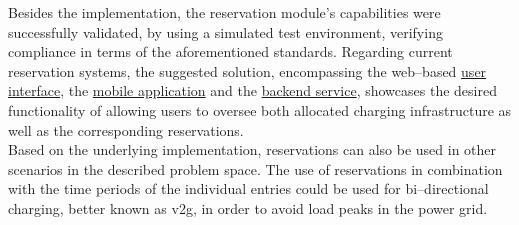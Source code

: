 Besides the implementation, the reservation module's capabilities were successfully validated, by using a simulated test environment, verifying compliance in terms of the aforementioned standards.
Regarding current reservation systems, the suggested solution, encompassing the web--based \href{https://github.com/JulianHBuecher/ev-dashboard/tree/reservation-process}{user interface}, the \href{https://github.com/JulianHBuecher/ev-mobile/tree/reservation-process}{mobile application} and the \href{https://github.com/JulianHBuecher/ev-server/tree/reservation-process}{backend service}, showcases the desired functionality of allowing users to oversee both allocated charging infrastructure as well as the corresponding reservations.\\
Based on the underlying implementation, reservations can also be used in other scenarios in the described problem space. 
The use of reservations in combination with the time periods of the individual entries could be used for bi--directional charging, better known as \acrfull{v2g}, in order to avoid load peaks in the power grid.